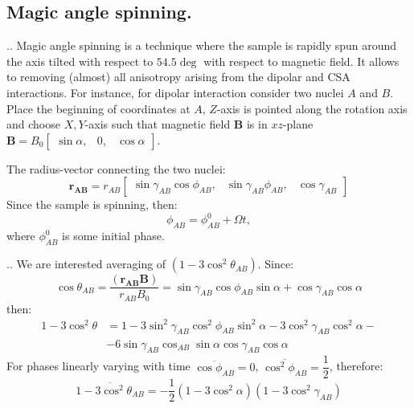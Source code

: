 \documentclass{beamer}
\begin{document}
\subsection{Magic angle spinning.}
\begin{frame}{\thesection.\thesubsection. \insertsubsection}
    Magic angle spinning is a technique where the sample is rapidly spun around the axis tilted with respect to $54.5 \deg$ with respect to magnetic field. It allows to removing (almost) all anisotropy arising from the dipolar and CSA interactions. 
    For instance, for dipolar interaction consider two nuclei $A$ and $B$. Place the beginning of coordinates at $A$, $Z$-axis is pointed along the rotation axis and choose $X,Y$-axis such that magnetic field $\bm{B}$ is in $xz$-plane  $\bm{B} = B_0 \begin{bmatrix} 
    \sin \alpha,  &  0, & \cos \alpha
    \end{bmatrix}$.
    
     The radius-vector connecting the two nuclei:
    \begin{equation}
      \bm{r_{AB}} = r_{AB} 
      \begin{bmatrix} 
        \sin \gamma_{AB} \cos \phi_{AB},  &  \sin \gamma_{AB} \phi_{AB}, & \cos \gamma_{AB}
      \end{bmatrix}
    \end{equation}
    Since the sample is spinning, then:
    \begin{equation}
       \phi_{AB} = \phi_{AB}^0 + \Omega t,
    \end{equation}
    where $\phi_{AB}^0$ is some initial phase. 
\end{frame}

\begin{frame}{\thesection.\thesubsection. \insertsubsection}
   We are interested averaging of $(1 - 3 \cos^2 \theta_{AB})$. Since:
   \begin{equation}
      \cos \theta_{AB} = \dfrac{(\bm{r_{AB}}  \bm{B})}{r_{AB} B_0} = \sin \gamma_{AB} \cos \phi_{AB} \sin \alpha + \cos \gamma_{AB} \cos \alpha
   \end{equation}
   then:
   \begin{align}
     1 - 3 \cos^2 \theta &= 1 - 3 \sin^2 \gamma_{AB} \cos^2 \phi_{AB} \sin^2 \alpha -3 \cos^2 \gamma_{AB} \cos^2 \alpha - \\
     &- 6 \sin \gamma_{AB} \cos_{AB} \sin \alpha \cos \gamma_{AB} \cos \alpha
   \end{align}
   For phases linearly varying with time $\overline{\cos \phi_{AB}} = 0 $,  $\overline{\cos^2 \phi_{AB}} = \dfrac{1}{2} $, therefore:
   \begin{equation} \label{eq: MAS}
      \overline{1-3 \cos^2 \theta_{AB}} = -\dfrac{1}{2}(1 - 3 \cos^2 \alpha)(1 - 3 \cos^2 \gamma_{AB})
   \end{equation}

   
\end{frame}
\end{document}
